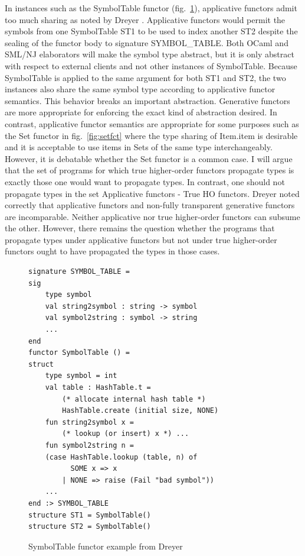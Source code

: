 \documentclass[12pt]{article}
\begin{document}
In instances such as the SymbolTable functor (fig.~\ref{fig:symtbl}), applicative functors admit too much sharing as noted by Dreyer \cite{dreyerthesis}. Applicative functors would permit the symbols from one SymbolTable ST1 to be used to index another ST2 despite the sealing of the functor body to signature SYMBOL\_TABLE. Both OCaml and SML/NJ elaborators will make the symbol type abstract, but it is only abstract with respect to external clients and not other instances of SymbolTable. Because SymbolTable is applied to the same argument for both ST1 and ST2, the two instances also share the same symbol type according to applicative functor semantics. This behavior breaks an important abstraction. Generative functors are more appropriate for enforcing the exact kind of abstraction desired. In contrast, applicative functor semantics are appropriate for some purposes such as the Set functor in fig.~\ref{fig:setfct} where the type sharing of Item.item is desirable and it is acceptable to use items in Sets of the same type interchangeably. However, it is debatable whether the Set functor is a common case. I will argue that the set of programs for which true higher-order functors propagate types is exactly those one would want to propagate types. In contrast, one should not propagate types in the set Applicative functors - True HO functors. Dreyer \cite{dreyerthesis} noted correctly that applicative functors and non-fully transparent generative functors are incomparable. Neither applicative nor true higher-order functors can subsume the other. However, there remains the question whether the programs that propagate types under applicative functors but not under true higher-order functors ought to have propagated the types in those cases. 

\begin{figure}
\begin{lstlisting}
signature SYMBOL_TABLE = 
sig 
	type symbol 
	val string2symbol : string -> symbol 
	val symbol2string : symbol -> string 
	... 
end 
functor SymbolTable () = 
struct 
	type symbol = int 
	val table : HashTable.t = 
		(* allocate internal hash table *) 
		HashTable.create (initial size, NONE) 
	fun string2symbol x = 
		(* lookup (or insert) x *) ... 
	fun symbol2string n = 
	(case HashTable.lookup (table, n) of 
		  SOME x => x 
		| NONE => raise (Fail "bad symbol")) 
	... 
end :> SYMBOL_TABLE 
structure ST1 = SymbolTable() 
structure ST2 = SymbolTable() 
\end{lstlisting}
\caption{SymbolTable functor example from Dreyer\cite{dreyerthesis}}
\label{fig:symtbl}	
\end{figure}
\end{document}
